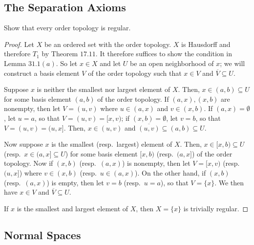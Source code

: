 \documentclass[12pt]{article}
\theoremstyle{remark}
\begin{document}
\subsection{The Separation Axioms}
\setcounter{subsubsection}{2}
\begin{problem}
  Show that every order topology is regular.
\end{problem}
\begin{proof}
  Let $X$ be an ordered set with the order topology. $X$ is Hausdorff and
  therefore $T_1$ by Theorem $17.11$. It therefore suffices to show the
  condition in Lemma $31.1(a)$. So let $x \in X$ and let $U$ be an open
  neighborhood of $x$; we will construct a basis element $V$ of the order
  topology such that $x \in V$ and $\overline{V} \subseteq U$.
  \par Suppose $x$ is neither the smallest nor largest element of $X$. Then, $x
  \in (a,b) \subseteq U$ for some basis element $(a,b)$ of the order topology.
  If $(a,x),(x,b)$ are nonempty, then let $V = (u,v)$ where $u \in (a,x)$ and
  $v \in (x,b)$. If $(a,x) = \emptyset$, let $u=a$, so that $V = (u,v) = [x,v)$; if
  $(x,b) = \emptyset$, let $v=b$, so that $V = (u,v) = (u,x]$.
  Then, $x \in (u,v)$ and $\overline{(u,v)} \subseteq (a,b) \subseteq U$.
  \par Now suppose $x$ is the smallest (resp.~largest) element of $X$. Then, $x
  \in [x,b) \subseteq U$ (resp.~$x \in (a,x] \subseteq U$) for some basis
  element $[x,b)$ (resp.~$(a,x]$) of the order topology. Now if $(x,b)$
  (resp.~$(a,x)$) is nonempty, then let $V = [x,v)$ (resp.~$(u,x]$) where
  $v \in (x,b)$ (resp.~$u \in (a,x)$). On the other hand, if $(x,b)$
  (resp.~$(a,x)$) is empty, then let $v=b$ (resp.~$u=a$), so that $V = \{x\}$.
  We then have $x \in V$ and $\overline{V} \subseteq U$.
  \par If $x$ is the smallest and largest element of $X$, then $X = \{x\}$ is
  trivially regular.
\end{proof}

\subsection{Normal Spaces}

\cleardoublepage
{}
{\footnotesize\tableofcontents}
\end{document}
